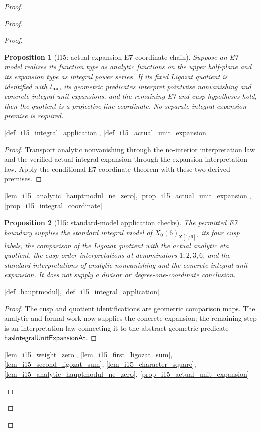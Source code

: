 \documentclass[11pt,a4paper]{article}
\numberwithin{equation}{section}
\theoremstyle{plain}\newtheorem{theorem}{Theorem}[section]\newaliascnt{proposition}{theorem}\newtheorem{proposition}[proposition]{Proposition}\aliascntresetthe{proposition}\newaliascnt{lemma}{theorem}\newtheorem{lemma}[lemma]{Lemma}\aliascntresetthe{lemma}
\theoremstyle{definition}\newaliascnt{definition}{theorem}\newtheorem{definition}[definition]{Definition}\aliascntresetthe{definition}\newaliascnt{notation}{theorem}\newtheorem{notation}[notation]{Notation}\aliascntresetthe{notation}
\providecommand{\lean}[1]{}\providecommand{\leanok}{}
\begin{document}
\begin{proof}
\begin{proof}
\begin{proof}
\begin{proposition}[I15: actual-expansion E7 coordinate chain]\label{prop_i15_actual_expansion_coordinate_chain}\lean{SptCM.Repair.analyticHauptmodul_integral_coordinate_of_E7}\leanok
Suppose an E7 model realizes its function type as analytic functions on the
upper half-plane and its expansion type as integral power series.  If its
fixed Ligozat quotient is identified with \(t_{\rm an}\), its geometric
predicates interpret pointwise nonvanishing and concrete integral unit
expansions, and the remaining E7 and cusp hypotheses hold, then the quotient
is a projective-line coordinate.  No separate integral-expansion premise is
required.
\end{proposition}
\begin{uses-statement}\ref{def_i15_integral_application}, \ref{def_i15_actual_unit_expansion}\end{uses-statement}
\begin{proof}
Transport analytic nonvanishing through the no-interior interpretation law
and the verified actual integral expansion through the expansion
interpretation law.  Apply the conditional E7 coordinate theorem with these
two derived premises.
\end{proof}
\begin{uses-proof}\ref{lem_i15_analytic_hauptmodul_ne_zero},
\ref{prop_i15_actual_unit_expansion},
\ref{prop_i15_integral_coordinate}\end{uses-proof}

\begin{proposition}[I15: standard-model application checks]\label{prop_i15_application_checks}\lean{SptCM.Repair.E7ActualX0SixApplicationChecks}\leanok
The permitted E7 boundary supplies the standard integral model of
$X_0(6)_{\mathbf Z[1/6]}$, its four cusp labels, the comparison of the
Ligozat quotient with the actual analytic eta quotient, the cusp-order
interpretations at denominators $1,2,3,6$, and the standard interpretations
of analytic nonvanishing and the concrete integral unit expansion.  It does
not supply a divisor or degree-one-coordinate conclusion.
\end{proposition}
\begin{uses-statement}\ref{def_hauptmodul}, \ref{def_i15_integral_application}\end{uses-statement}
\begin{proof}
The cusp and quotient identifications are geometric comparison maps.  The
analytic and formal work now supplies the concrete expansion; the remaining
step is an interpretation law connecting it to the abstract geometric
predicate \(\mathsf{hasIntegralUnitExpansionAt}\).
\end{proof}
\begin{uses-proof}\ref{lem_i15_weight_zero}, \ref{lem_i15_first_ligozat_sum},
\ref{lem_i15_second_ligozat_sum}, \ref{lem_i15_character_square},
\ref{lem_i15_analytic_hauptmodul_ne_zero},
\ref{prop_i15_actual_unit_expansion}\end{uses-proof}


\end{proof}
\end{proof}
\end{proof}
\end{document}
